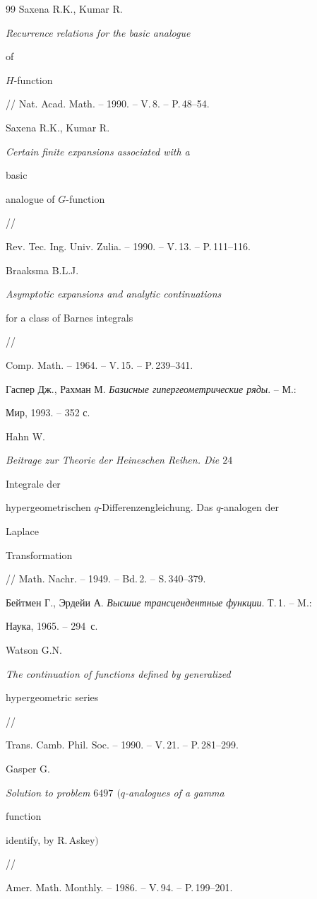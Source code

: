 \begin{thebibliography}{99}
Saxena R.K., Kumar R. {\em Recurrence relations for the basic analogue 


of 


$H$-function} // Nat. Acad. Math. -- 1990. -- V.\,8. -- P.\,48--54. 




Saxena R.K., Kumar R. {\em Certain finite expansions associated with a 


basic 


analogue of $G$-function} // 


Rev. Tec. Ing. Univ. Zulia. -- 1990. -- V.\,13. -- P.\,111--116. 




Braaksma B.L.J. {\em Asymptotic expansions and analytic continuations 


for a class of Barnes integrals} // 


Comp. Math. -- 1964. -- V.\,15. -- P.\,239--341. 




Гаспер Дж., Рахман М. {\em Базисные гипергеометрические ряды}. -- М.: 


Мир, 1993. -- 352 с. 




Hahn W. {\em Beitrage zur Theorie der Heineschen Reihen. Die $24$ 


Integrale der 


hypergeometrischen $q$-Differenzengleichung. Das $q$-analogen der 


Laplace 


Transformation} // Math. Nachr. -- 1949. -- Bd.\,2. -- S.\,340--379. 




Бейтмен Г., Эрдейи А. {\em Высшие трансцендентные функции}. Т.\,1.  -- M.: 


Наука, 1965. -- 294~с.




Watson G.N. {\em The continuation of functions defined by generalized 


hypergeometric series} // 


Trans. Camb. Phil. Soc. -- 1990. -- V.\,21. -- P.\,281--299. 




Gasper G. {\em Solution to problem $6497$ $(q$-analogues of a gamma 


function 


identify, by R.\,Askey$)$} // 


Amer. Math. Monthly. -- 1986. -- V.\,94. -- P.\,199--201. 


 


\end{thebibliography} 


